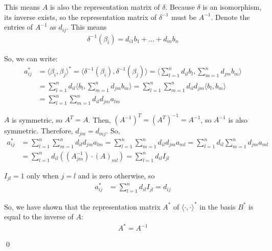 \documentclass[12pt]{article}
\begin{document}
\begin{enumerate}[label=\alph*)]
    This means $A$ is also the representation matrix of $\delta$. Because $\delta$ is an isomorphism, its inverse exists, so the representation matrix of $\delta^{-1}$ must be $A^{-1}$. Denote the entries of $A^{-1}$ as $d_{ij}$. This means
    \[
    \begin{aligned}
        \delta^{-1}(\beta_i) = d_{i1} b_1 + \dots + d_{in} b_n
    \end{aligned}
    \]
    
    So, we can write:
    \[
    \begin{aligned}
        a^*_{ij} &= \langle \beta_i, \beta_j \rangle^* = \langle \delta^{-1}(\beta_i), \delta^{-1}(\beta_j) \rangle = \langle \sum_{l = 1}^{n} d_{il} b_l, \sum_{m = 1}^{n} d_{jm} b_m \rangle \\
        &= \sum_{l = 1}^{n} d_{il} \langle b_l, \sum_{m = 1}^{n} d_{jm} b_m \rangle = \sum_{l = 1}^{n} \sum_{m = 1}^{n} d_{il} d_{jm} \langle b_l, b_m \rangle \\
        &= \sum_{l = 1}^{n} \sum_{m = 1}^{n} d_{il} d_{jm} a_{lm}
    \end{aligned}
    \]

    $A$ is symmetric, so $A^T = A$. Then, $(A^{-1})^T = (A^T)^{-1} = A^{-1}$, so $A^{-1}$ is also symmetric. Therefore, $d_{jm} = d_{mj}$. So,
    \[
    \begin{aligned}
        a^*_{ij} &= \sum_{l = 1}^{n} \sum_{m = 1}^{n} d_{il} d_{jm} a_{lm} = \sum_{l = 1}^{n} \sum_{m = 1}^{n} d_{il} d_{jm} a_{ml} = \sum_{l = 1}^{n} d_{il} \sum_{m = 1}^{n} d_{jm} a_{ml} \\
        &= \sum_{l = 1}^{n} d_{il} \left((A^{-1}_{jm}) \cdot (A)_{ml}\right) = \sum_{l = 1}^{n} d_{il} I_{jl}
    \end{aligned}
    \]

    $I_{jl} = 1$ only when $j = l$ and is zero otherwise, so
    \[
    \begin{aligned}
        a^*_{ij} &= \sum_{l = 1}^{n} d_{il} I_{jl} = d_{ij}
    \end{aligned}
    \]

    So, we have shown that the representation matrix $A^*$ of $\langle \cdot, \cdot \rangle^*$ in the basis $B^*$ is equal to the inverse of $A$:
    \[
    \begin{aligned}
        A^* = A^{-1}
    \end{aligned}
    \]

    \qed
\end{enumerate}

\newpage
\end{document}
